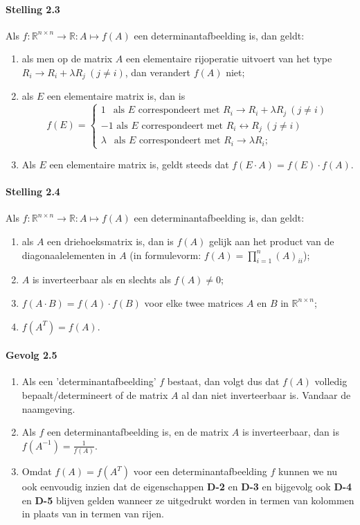 \documentclass[11pt,oneside,a4paper]{article}
\begin{document}
	\paragraph{Stelling 2.3}
		Als $f: \mathbb{R}^{n \times n} \to \mathbb{R}: A \mapsto f(A)$ een determinantafbeelding is, dan geldt:
		\begin{enumerate}
			\item als men op de matrix $A$ een elementaire rijoperatie uitvoert van het type $R_i \to R_i + \lambda R_j \ (j\ne i)$, dan verandert $f(A)$ niet;
			\item als $E$ een elementaire matrix is, dan is 
			$$ f(E) = \begin{cases}
				1 \ \ \text{ als $E$ correspondeert met $R_i \to R_i + \lambda R_j \ (j\ne i)$}\\
				-1 \text{ als $E$ correspondeert met $R_i \leftrightarrow R_j \ (j\ne i)$}\\
			 	\lambda \ \ \text{ als $E$ correspondeert met $R_i \to \lambda R_i$;}
			\end{cases} $$
			\item Als $E$ een elementaire matrix is, geldt steeds dat $f(E \cdot A) = f(E) \cdot f(A)$.
		\end{enumerate}
	\paragraph{Stelling 2.4}
		Als $f: \mathbb{R}^{n \times n} \to \mathbb{R}: A \mapsto f(A)$ een determinantafbeelding is, dan geldt:
		\begin{enumerate}
			\item als $A$ een driehoeksmatrix is, dan is $f(A)$ gelijk aan het product van de diagonaalelementen in $A$ (in formulevorm: $f(A)= \prod_{i=1}^{n} (A)_{ii}$);
			\item $A$ is inverteerbaar als en slechts als $f(A) \ne 0$;
			\item $f(A \cdot B) = f(A) \cdot f(B)$ voor elke twee matrices $A$ en $B$ in $\mathbb{R}^{n \times n}$;
			\item $f(A^T) = f(A)$.
		\end{enumerate}
	\paragraph{Gevolg 2.5}
		\begin{enumerate}
			\item Als een 'determinantafbeelding' $f$ bestaat, dan volgt dus dat $f(A)$ volledig bepaalt/determineert of de matrix $A$ al dan niet inverteerbaar is. Vandaar de naamgeving.
			\item Als $f$ een determinantafbeelding is, en de matrix $A$ is inverteerbaar, dan is $f(A^{-1}) = \frac{1}{f(A)}$.
			\item Omdat $f(A) = f(A^T)$ voor een determinantafbeelding $f$ kunnen we nu ook eenvoudig inzien dat de eigenschappen \textbf{D-2} en \textbf{D-3} en bijgevolg ook \textbf{D-4} en \textbf{D-5} blijven gelden wanneer ze uitgedrukt worden in termen van kolommen in plaats van in termen van rijen.
		\end{enumerate}
\end{document}
